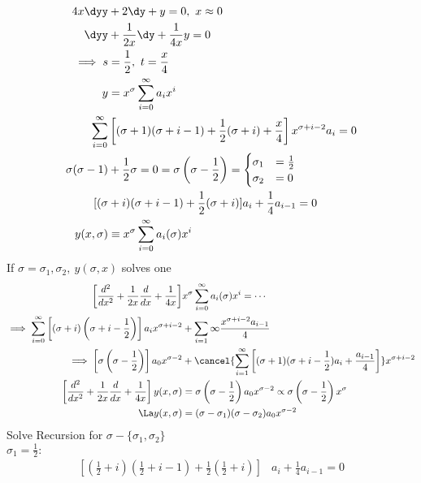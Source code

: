 \documentclass[Maths.tex]{subfiles}
\begin{document}
\begin{example}
\begin{align}
    4x\dyy &+ 2\dy + y = 0,~ x \approx 0 \\
    \dyy &+ \frac{1}{2x}\dy + \frac{1}{4x}y = 0 \\
    \implies s &= \frac{1}{2},~ t = \frac{x}{4} \\
    y &= x^\sigma \sum_{i=0}^\infty a_ix^i \\
    \sum_{i=0}^\infty & \left[(\sigma+1)(\sigma+i-1) + \frac{1}{2}(\sigma+i) + \frac{x}{4}\right]x^{\sigma+i-2}a_i = 0 \\
    \sigma(\sigma-1)&+\frac{1}{2}\sigma = 0 = \sigma\left(\sigma-\frac{1}{2}\right) = \begin{cases} \sigma_1 & = \frac{1}{2} \\ \sigma_2 & = 0 \end{cases} \\
    [(\sigma &+ i)(\sigma+i-1) + \frac{1}{2}(\sigma+i)]a_i + \frac{1}{4}a_{i-1} = 0 \\
    y(x,\sigma) &\equiv x^\sigma \sum_{i=0}^\infty a_i(\sigma)x^i
\end{align}
If $\sigma = \sigma_1, \sigma_2,~ y(\sigma,x)$ solves one
\begin{align}
    \left[\frac{d^2}{dx^2}+\frac{1}{2x}\frac{d}{dx}+ \frac{1}{4x}\right]&x^\sigma \sum_{i=0}^\infty a_i(\sigma)x^i = \cdots \\
    \implies \sum_{i=0}^\infty  \left[(\sigma+i)\left(\sigma+i-\frac{1}{2}\right)\right]a_ix^{\sigma+i-2} &+ \sum_{i=1}\infty \frac{x^{\sigma+i-2}a_{i-1}}{4} \\
    \implies \left[\sigma\left(\sigma-\frac{1}{2}\right)\right] a_0x^{\sigma-2} &+ \cancel{\sum_{i=1}^\infty \left[(\sigma+1)(\sigma + i - \frac{1}{2})a_i + \frac{a_{i-1}}{4}\right]}x^{\sigma+i-2} \\
    \left[\frac{d^2}{dx^2} + \frac{1}{2x}\frac{d}{dx} + \frac{1}{4x}\right]y(x,\sigma) &= \sigma\left(\sigma - \frac{1}{2}\right)a_0 x^{\sigma-2} \propto \sigma\left(\sigma-\frac{1}{2}\right)x^{\sigma} \\
    \La y(x,\sigma) &= (\sigma - \sigma_1)(\sigma - \sigma_2)a_0 x^{\sigma - 2}
\end{align}
Solve Recursion for $\sigma - \{\sigma_1,\sigma_2\}$ \\
$\sigma_1 = \frac{1}{2}:$
\begin{align}
    \left[(\frac{1}{2}+i)(\frac{1}{2}+i-1) + \frac{1}{2}(\frac{1}{2}+i)\right]&a_i + \frac{1}{4} a_{i-1} = 0 \\

\end{align}
\end{example}
\end{document}
